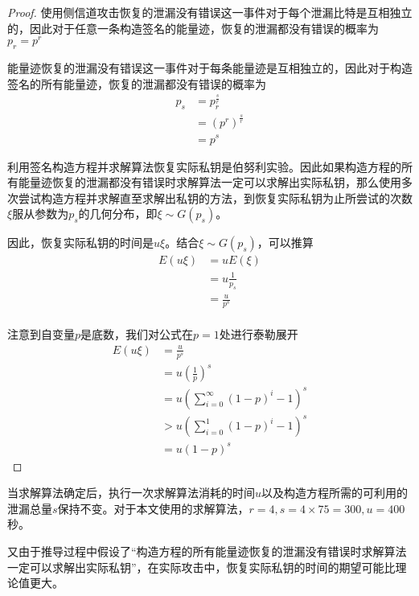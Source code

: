 {\begin{proof}
		使用侧信道攻击恢复的泄漏没有错误这一事件对于每个泄漏比特是互相独立的，因此对于任意一条构造签名的能量迹，恢复的泄漏都没有错误的概率为$p_r=p^r$
	
		能量迹恢复的泄漏没有错误这一事件对于每条能量迹是互相独立的，因此对于构造签名的所有能量迹，恢复的泄漏都没有错误的概率为\begin{align*}
			p_s&=p_r^{\frac sr}\\
			&=\left(p^r \right) ^{\frac sr}\\
			&=p^s
		\end{align*}
	
		利用签名构造方程并求解算法恢复实际私钥是伯努利实验。因此如果构造方程的所有能量迹恢复的泄漏都没有错误时求解算法一定可以求解出实际私钥，那么使用多次尝试构造方程并求解直至求解出私钥的方法，到恢复实际私钥为止所尝试的次数$\xi$服从参数为$p_s$的几何分布，即$\xi\sim G(p_s)$。
		
		因此，恢复实际私钥的时间是$u\xi$。结合$\xi\sim G(p_s)$，可以推算\begin{align*}
			E(u\xi)&=uE(\xi)\\
			&=u\frac{1}{p_s}\\
			&=\frac{u}{p^s}\\
		\end{align*}
	
		注意到自变量$p$是底数，我们对公式在$p=1$处进行泰勒展开\begin{align*}
			E(u\xi)&=\frac{u}{p^s}\\
			&=u\left( \frac1p\right) ^s\\
			&=u\left( \sum\limits_{i=0}^{\infty}\left( 1-p\right) ^i-1\right) ^s\\
			&>u\left( \sum\limits_{i=0}^{1}\left( 1-p\right) ^i-1\right) ^s\\
			&=u\left( 1-p\right) ^s
		\end{align*}

	\end{proof}
	当求解算法确定后，执行一次求解算法消耗的时间$u$以及构造方程所需的可利用的泄漏总量$s$保持不变。对于本文使用的求解算法，$r=4,s=4\times75=300,u=400$秒。%
	
	又由于推导过程中假设了“构造方程的所有能量迹恢复的泄漏没有错误时求解算法一定可以求解出实际私钥”，在实际攻击中，恢复实际私钥的时间的期望可能比理论值更大。
	
}

